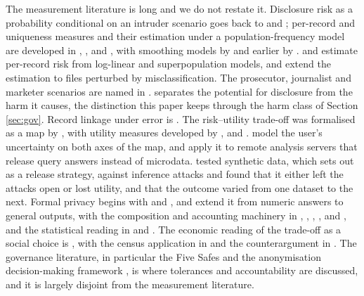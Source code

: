 \documentclass[11pt,a4paper]{article}
\theoremstyle{plain}
\theoremstyle{definition}
\theoremstyle{definition}
\theoremstyle{plain}
\begin{document}
The measurement literature is long and we do not restate it. Disclosure risk as
a probability conditional on an intruder scenario goes back to
\citet{duncan1989} and \citet{elliot1999}; per-record
and uniqueness measures and their estimation under a population-frequency model
are developed in \citet{skinnerholmes1998}, \citet{skinner2002},
\citet{reiter2005} and \citet{skinner2008}, with smoothing models by
\citet{rinott2006} and earlier by \citet{bethlehem1990}. \citet{elamir2004}
and \citet{franconi2004} estimate per-record risk from log-linear and
superpopulation models, and \citet{shlomoskinner2010} extend the estimation to
files perturbed by misclassification. The prosecutor,
journalist and marketer scenarios are named in \citet{elemam2008}.
\citet{skinner2012} separates the potential for disclosure from the harm it
causes, the distinction this paper keeps through the harm class of Section
\ref{sec:gov}. Record linkage under error is \citet{fellegi1969}. The risk--utility trade-off
was formalised as a map by \citet{duncan2001}, with utility measures developed
by \citet{karr2006}, \citet{woo2009} and \citet{snoke2018}.
\citet{trottini2002} model the user's uncertainty on both axes of the map, and
\citet{gomatam2005} apply it to remote analysis servers that release query
answers instead of microdata. \citet{stadler2022} tested synthetic data, which
\citet{drechsler2011} sets out as a release strategy, against inference attacks
and found that it either left the attacks open or lost utility, and that the
outcome varied from one dataset to the next. Formal privacy
begins with \citet{dinur2003} and \citet{dwork2006a,dwork2006b}, and
\citet{mcsherry2007} extend it from numeric answers to general outputs, with the
composition and accounting machinery in \citet{dwork2010}, \citet{kairouz2017},
\citet{dwork2014},
\citet{bun2016}, \citet{mironov2017} and \citet{dong2022}, and the statistical
reading in \citet{wasserman2010} and \citet{duchi2018}. The economic reading of
the trade-off as a social choice is \citet{abowd2019}, with the census
application in \citet{abowd2022} and the counterargument in \citet{hotz2022}.
The governance literature, in particular the Five Safes
\citep{desai2016} and the anonymisation decision-making framework
\citep{elliot2020}, is where tolerances and accountability are discussed, and it
is largely disjoint from the measurement literature.
\end{document}
